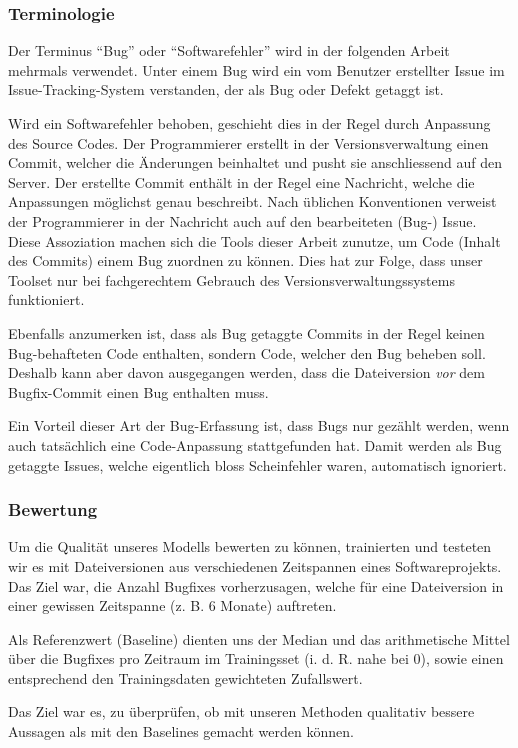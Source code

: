 \documentclass[10pt, a4paper]{article}
\begin{document}
\subsubsection{Terminologie}
Der Terminus ``Bug'' oder ``Softwarefehler'' wird in der folgenden Arbeit mehrmals verwendet. Unter einem Bug wird ein vom Benutzer erstellter Issue im Issue-Tracking-System verstanden, der als Bug oder Defekt getaggt ist.

Wird ein Softwarefehler behoben, geschieht dies in der Regel durch Anpassung des Source Codes. Der Programmierer erstellt in der Versionsverwaltung einen Commit, welcher die Änderungen beinhaltet und pusht sie anschliessend auf den Server. Der erstellte Commit enthält in der Regel eine Nachricht, welche die Anpassungen möglichst genau beschreibt. Nach üblichen Konventionen verweist der Programmierer in der Nachricht auch auf den bearbeiteten (Bug-) Issue. Diese Assoziation machen sich die Tools dieser Arbeit zunutze, um Code (Inhalt des Commits) einem Bug zuordnen zu können. Dies hat zur Folge, dass unser Toolset nur bei fachgerechtem Gebrauch des Versionsverwaltungssystems funktioniert. 

Ebenfalls anzumerken ist, dass als Bug getaggte Commits in der Regel keinen Bug-behafteten Code enthalten, sondern Code, welcher den Bug beheben soll. Deshalb kann aber davon ausgegangen werden, dass die Dateiversion \emph{vor} dem Bugfix-Commit einen Bug enthalten muss.

Ein Vorteil dieser Art der Bug-Erfassung ist, dass Bugs nur gezählt werden, wenn auch tatsächlich eine Code-Anpassung stattgefunden hat. Damit werden als Bug getaggte Issues, welche eigentlich bloss Scheinfehler waren, automatisch ignoriert.

\subsubsection{Bewertung}
Um die Qualität unseres Modells bewerten zu können, trainierten und testeten wir es mit Dateiversionen aus verschiedenen Zeitspannen eines Softwareprojekts. Das Ziel war, die Anzahl Bugfixes vorherzusagen, welche für eine Dateiversion in einer gewissen Zeitspanne (z. B. 6 Monate) auftreten.

Als Referenzwert (Baseline) dienten uns der Median und das arithmetische Mittel über die Bugfixes pro Zeitraum im Trainingsset (i. d. R. nahe bei 0), sowie einen entsprechend den Trainingsdaten gewichteten Zufallswert. 

Das Ziel war es, zu überprüfen, ob mit unseren Methoden qualitativ bessere Aussagen als mit den Baselines gemacht werden können.
\end{document}
